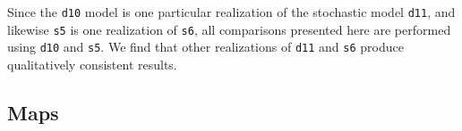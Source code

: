 \documentclass[twocolumn]{aastex631}
\begin{document}
Since the \texttt{d10} model is one particular realization of the stochastic model \texttt{d11}, and likewise \texttt{s5} is one realization of \texttt{s6}, all comparisons presented here are performed using \texttt{d10} and \texttt{s5}. We find that other realizations of \texttt{d11} and \texttt{s6} produce qualitatively consistent results.

\subsection{Maps}\label{subsec:maps}


\end{document}
